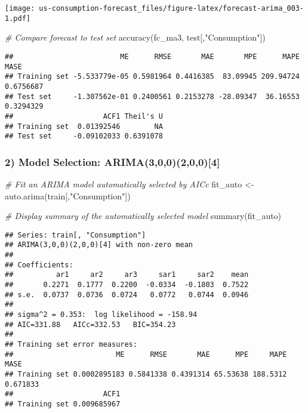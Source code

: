 \documentclass[
  12pt,
]{article}
\newenvironment{Shaded}{\begin{snugshade}}{\end{snugshade}}
\newcommand{\CommentTok}[1]{\textcolor[rgb]{0.56,0.35,0.01}{\textit{#1}}}
\newcommand{\FunctionTok}[1]{\textcolor[rgb]{0.00,0.00,0.00}{#1}}
\newcommand{\NormalTok}[1]{#1}
\newcommand{\OtherTok}[1]{\textcolor[rgb]{0.56,0.35,0.01}{#1}}
\newcommand{\StringTok}[1]{\textcolor[rgb]{0.31,0.60,0.02}{#1}}
\begin{document}
\texttt{[image: us-consumption-forecast\_files/figure-latex/forecast-arima\_003-1.pdf]}

\begin{Shaded}
\begin{Highlighting}[]
\CommentTok{\# Compare forecast to test set}
\FunctionTok{accuracy}\NormalTok{(fc\_ma3, test[,}\StringTok{"Consumption"}\NormalTok{])}
\end{Highlighting}
\end{Shaded}

\begin{verbatim}
##                         ME      RMSE       MAE       MPE      MAPE      MASE
## Training set -5.533779e-05 0.5981964 0.4416385  83.09945 209.94724 0.6756687
## Test set     -1.307562e-01 0.2400561 0.2153278 -28.09347  36.16553 0.3294329
##                     ACF1 Theil's U
## Training set  0.01392546        NA
## Test set     -0.09102033 0.6391078
\end{verbatim}

\hypertarget{model-selection-arima3002004}{%
\subsubsection{2) Model Selection:
ARIMA(3,0,0)(2,0,0){[}4{]}}\label{model-selection-arima3002004}}

\begin{Shaded}
\begin{Highlighting}[]
\CommentTok{\# Fit an ARIMA model automatically selected by AICc}
\NormalTok{fit\_auto }\OtherTok{\textless{}{-}} \FunctionTok{auto.arima}\NormalTok{(train[,}\StringTok{"Consumption"}\NormalTok{])}

\CommentTok{\# Display summary of the automatically selected model}
\FunctionTok{summary}\NormalTok{(fit\_auto)}
\end{Highlighting}
\end{Shaded}

\begin{verbatim}
## Series: train[, "Consumption"] 
## ARIMA(3,0,0)(2,0,0)[4] with non-zero mean 
## 
## Coefficients:
##          ar1     ar2     ar3     sar1     sar2    mean
##       0.2271  0.1777  0.2200  -0.0334  -0.1803  0.7522
## s.e.  0.0737  0.0736  0.0724   0.0772   0.0744  0.0946
## 
## sigma^2 = 0.353:  log likelihood = -158.94
## AIC=331.88   AICc=332.53   BIC=354.23
## 
## Training set error measures:
##                        ME      RMSE       MAE      MPE     MAPE     MASE
## Training set 0.0002895183 0.5841338 0.4391314 65.53638 188.5312 0.671833
##                     ACF1
## Training set 0.009685967
\end{verbatim}
\end{document}
